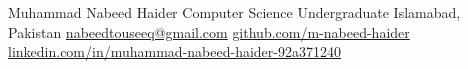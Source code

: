 
\ResumeHeader
{Muhammad Nabeed Haider}
{Computer Science Undergraduate}
{Islamabad, Pakistan}
{\href{mailto:nabeedtouseeq@gmail.com}{nabeedtouseeq@gmail.com}}
{\href{https://github.com/m-nabeed-haider}{github.com/m-nabeed-haider}}
{\href{https://www.linkedin.com/in/muhammad-nabeed-haider-92a371240}{linkedin.com/in/muhammad-nabeed-haider-92a371240}}